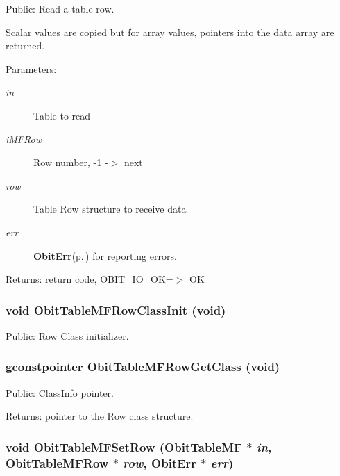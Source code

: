Public: Read a table row. 

Scalar values are copied but for array values, pointers into the data array are returned. \begin{Desc}
\item[Parameters:]
\begin{description}
\item[{\em in}]Table to read \item[{\em i\-MFRow}]Row number, -1 -$>$ next \item[{\em row}]Table Row structure to receive data \item[{\em err}]{\bf Obit\-Err}{\rm (p.\,\pageref{structObitErr})} for reporting errors. \end{description}
\end{Desc}
\begin{Desc}
\item[Returns:]return code, OBIT\_\-IO\_\-OK=$>$ OK \end{Desc}
\subsubsection{\setlength{\rightskip}{0pt plus 5cm}void Obit\-Table\-MFRow\-Class\-Init (void)}\label{ObitTableMF_8h_a7}


Public: Row Class initializer. 

\subsubsection{\setlength{\rightskip}{0pt plus 5cm}gconstpointer Obit\-Table\-MFRow\-Get\-Class (void)}\label{ObitTableMF_8h_a9}


Public: Class\-Info pointer. 

\begin{Desc}
\item[Returns:]pointer to the Row class structure. \end{Desc}
\subsubsection{\setlength{\rightskip}{0pt plus 5cm}void Obit\-Table\-MFSet\-Row ({\bf Obit\-Table\-MF} $\ast$ {\em in}, {\bf Obit\-Table\-MFRow} $\ast$ {\em row}, {\bf Obit\-Err} $\ast$ {\em err})}\label{ObitTableMF_8h_a19}



